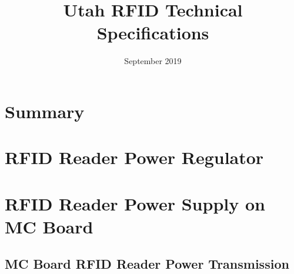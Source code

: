 \documentclass{article}
\title{Utah RFID Technical Specifications}
\author{}
\date{September 2019}
\begin{document}
\maketitle

\section{Summary}

\section{RFID Reader Power Regulator}

\section{RFID Reader Power Supply on MC Board}

\subsection{MC Board RFID Reader Power Transmission}
\end{document}
